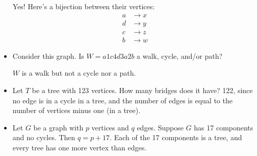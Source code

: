 \documentclass[]{article}
\theoremstyle{definition}
\newcommand{\lecture}[1]{\marginpar{{\footnotesize $\leftarrow$ \underline{#1}}}}
\begin{document}
\begin{itemize}
\begin{center}
				\end{center}

				Yes! Here's a bijection between their vertices:
				\begin{align*}
					a &\to x \\
					d &\to y \\
					c &\to z \\
					b &\to w
				\end{align*}

			\item Consider this graph. Is $W = a1c4d3a2b$ a walk, cycle, and/or path?
				\begin{center}
				\end{center}

				$W$ is a walk but not a cycle nor a path.

			\item \lecture{March 15, 2013}
				Let $T$ be a tree with 123 vertices. How many bridges does it have? 122, since no edge is in a cycle in a tree, and the number of edges is equal to the number of vertices minus one (in a tree).

			\item Let $G$ be a graph with $p$ vertices and $q$ edges. Suppose $G$ has 17 components and no cycles. Then $q = p + 17$. Each of the 17 components is a tree, and every tree has one more vertex than edges.


\end{itemize}
\end{document}
